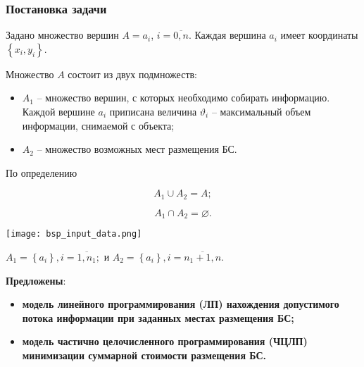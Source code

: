 \begin{frame}
    \frametitle{Постановка задачи}
    \fontsize{8pt}{7.2}\selectfont
    \justifying
    Задано множество вершин $A = a_i$, $i=\overline{0,n}$. Каждая вершина $a_i$ имеет координаты $\left\{ x_i, y_i \right\}$.
    
    \begin{minipage}[b]{0.5\linewidth}
        \bigskip

        Множество $A$ состоит из двух подмножеств: 
        \begin{itemize}
        \item $A_1$ -- множество вершин, с которых необходимо собирать информацию. Каждой вершине $a_i$ приписана   величина $\vartheta_i$ -- максимальный объем информации, снимаемой с объекта;
        \item $A_2$ -- множество возможных мест размещения БС. 
        \end{itemize}

        По определению

        $$
        A_1 \cup A_2 = A;
        $$

        $$
        A_1 \cap A_2 = \varnothing.
        $$   

    \end{minipage}     
    \hfill
    \begin{minipage}[b]{0.5\linewidth}
        \texttt{[image: bsp\_input\_data.png]}
    \end{minipage}
    \medskip

    $
    A_1 = \left\{a_i \right\}, i= \overline{1,n_1};
    $ и $
    A_2 = \left\{ a_i  \right\}, i= \overline{n_1+1,n}.
    $

    \textbf{Предложены}:
    \begin{itemize}
        \item \textbf{модель линейного программирования (ЛП) нахождения допустимого потока информации при заданных местах размещения БС;}
        \item \textbf{модель частично целочисленного программирования (ЧЦЛП) минимизации суммарной стоимости размещения  БС.}
    \end{itemize}

\end{frame}


